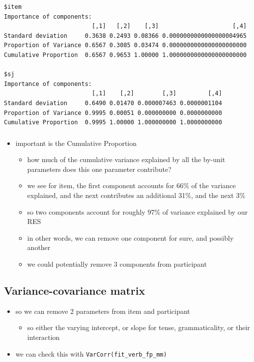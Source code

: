 \documentclass[
  letterpaper,
  DIV=11,
  numbers=noendperiod]{scrartcl}
\providecommand{\tightlist}{%
  \setlength{\itemsep}{0pt}\setlength{\parskip}{0pt}}\usepackage{longtable,booktabs,array}
\begin{document}
\begin{verbatim}
$item
Importance of components:
                         [,1]   [,2]    [,3]                     [,4]
Standard deviation     0.3638 0.2493 0.08366 0.0000000000000000004965
Proportion of Variance 0.6567 0.3085 0.03474 0.0000000000000000000000
Cumulative Proportion  0.6567 0.9653 1.00000 1.0000000000000000000000

$sj
Importance of components:
                         [,1]    [,2]        [,3]         [,4]
Standard deviation     0.6490 0.01470 0.000007463 0.0000001104
Proportion of Variance 0.9995 0.00051 0.000000000 0.0000000000
Cumulative Proportion  0.9995 1.00000 1.000000000 1.0000000000
\end{verbatim}

\hypertarget{section}{%
\subsubsection{}\label{section}}

\begin{itemize}
\tightlist
\item
  important is the Cumulative Proportion

  \begin{itemize}
  \tightlist
  \item
    how much of the cumulative variance explained by all the by-unit
    parameters does this one parameter contribute?
  \item
    we see for item, the first component accounts for 66\% of the
    variance explained, and the next contributes an additional 31\%, and
    the next 3\%
  \item
    so two components account for roughly 97\% of variance explained by
    our RES
  \item
    in other words, we can remove one component for sure, and possibly
    another
  \item
    we could potentially remove 3 components from participant
  \end{itemize}
\end{itemize}

\hypertarget{variance-covariance-matrix}{%
\subsection{Variance-covariance
matrix}\label{variance-covariance-matrix}}

\begin{itemize}
\tightlist
\item
  so we can remove 2 parameters from item and participant

  \begin{itemize}
  \tightlist
  \item
    so either the varying intercept, or slope for tense, grammaticality,
    or their interaction
  \end{itemize}
\item
  we can check this with \texttt{VarCorr(fit\_verb\_fp\_mm)}
\end{itemize}
\end{document}
